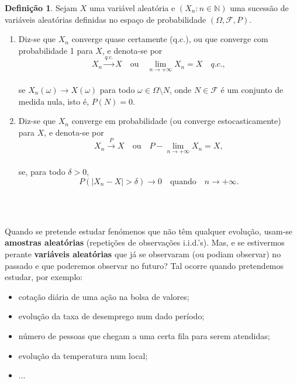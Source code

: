 \documentclass[
  11pt,
  a4paper,
]{book}
\theoremstyle{definition}
\newtheorem{definition}{Definição}[chapter]
\theoremstyle{definition}
\theoremstyle{definition}
\theoremstyle{definition}
\theoremstyle{remark}
\begin{document}
\begin{definition}

Sejam \(X\) uma variável aleatória e \((X_n : n \in \mathbb{N})\) uma sucessão de variáveis aleatórias definidas no espaço de probabilidade \((\Omega, \mathcal{F}, P)\).

\begin{enumerate}
\def\labelenumi{\roman{enumi})}
\item
  Diz-se que \(X_n\) converge quase certamente (q.c.), ou que converge com probabilidade 1 para \(X\), e denota-se por\\
  \[
  X_n \xrightarrow{q.c.} X \quad \text{ou} \quad \lim_{n \to +\infty} X_n = X \quad q.c.,
  \]\\
  se \(X_n(\omega) \to X(\omega)\) para todo \(\omega \in \Omega \setminus N\), onde \(N \in \mathcal{F}\) é um conjunto de medida nula, isto é, \(P(N) = 0\).
\item
  Diz-se que \(X_n\) converge em probabilidade (ou converge estocasticamente) para \(X\), e denota-se por\\
  \[
  X_n \xrightarrow{P} X \quad \text{ou} \quad P-\lim_{n \to +\infty} X_n = X,
  \]\\
  se, para todo \(\delta > 0\),\\
  \[
  P(|X_n - X| > \delta) \to 0 \quad \text{quando} \quad n \to +\infty.
  \]\\
\end{enumerate}

\end{definition}

\(\,\)

Quando se pretende estudar fenómenos que não têm qualquer evolução, usam-se \textbf{amostras
aleatórias} (repetições de observações i.i.d.'s). Mas, e se estivermos perante \textbf{variáveis
aleatórias} que já se observaram (ou podiam observar) no passado e que poderemos observar
no futuro? Tal ocorre quando pretendemos estudar, por exemplo:

\begin{itemize}
\item
  cotação diária de uma ação na bolsa de valores;
\item
  evolução da taxa de desemprego num dado período;
\item
  número de pessoas que chegam a uma certa fila para serem atendidas;
\item
  evolução da temperatura num local;
\item
  \(\ldots\)
\end{itemize}
\end{document}
